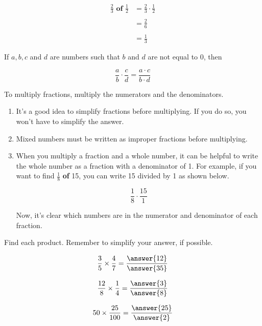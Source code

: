 \documentclass{ximera}[font=12pt]
\begin{document}
\begin{align*}
  \frac{2}{3} \textbf{ of } \frac{1}{2} &= \frac{2}{3} \cdot \frac{1}{2} \\
  & \\
  &= \frac{2}{6} \\
  &  \\
  &= \frac{1}{3}
\end{align*}

\begin{procedure}

If $a, b, c$ and $d$ are numbers such that $b$ and $d$ are not equal to 0, then

\[ \frac{a}{b} \cdot \frac{c}{d} = \frac{a \cdot c}{b \cdot d} \]


To multiply fractions, multiply the numerators and the denominators.

\end{procedure}

\begin{remark}
\begin{enumerate}
\item It's a good idea to simplify fractions before multiplying.  If you do so, you
won't have to simplify the answer.

\item Mixed numbers must be written as improper fractions before multiplying.

\item When you multiply a fraction and a whole number, it can be helpful to write the whole
number as a fraction with a denominator of 1.  For example, if you want to find $\textstyle \frac{1}{8}$ \textbf{of} 15, you can write 15
divided by 1 as shown below.

\[ \frac{1}{8} \cdot \frac{15}{1} \]

Now, it's clear which numbers are in the numerator and denominator of each fraction.

\end{enumerate}
\end{remark}

\begin{problem}
Find each product.  Remember to simplify your answer, if possible.

\[ \frac{3}{5} \times \frac{4}{7} = \frac{\answer{12}}{\answer{35}} \]

\[ \frac{12}{8} \times \frac{1}{4} = \frac{\answer{3}}{\answer{8}} \]

\[ 50 \times \frac{25}{100} = \frac{\answer{25}}{\answer{2}} \]

\end{problem}
\end{document}
